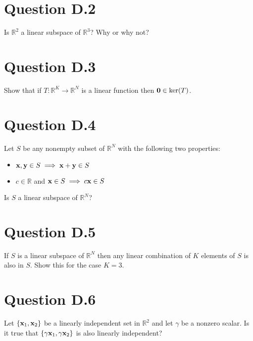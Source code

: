 \documentclass[letterpaper,10pt,english]{jupyterBook}
\begin{document}
\section{Question D.2}
\label{\detokenize{05.exercises.D:question-d-2}}
\sphinxAtStartPar
Is \(\mathbb{R}^2\) a linear subspace of \(\mathbb{R}^3\)? Why or why not?


\section{Question D.3}
\label{\detokenize{05.exercises.D:question-d-3}}
\sphinxAtStartPar
Show that if \(T \colon \mathbb{R}^K \to \mathbb{R}^N\) is a linear function then \({\bf 0} \in \mathrm{ker}(T)\).


\section{Question D.4}
\label{\detokenize{05.exercises.D:question-d-4}}
\sphinxAtStartPar
Let \(S\) be any nonempty subset of \(\mathbb{R}^N\) with the following two
properties:
\begin{itemize}
\item {} 
\sphinxAtStartPar
\({\bf x}, {\bf y} \in S \implies {\bf x} + {\bf y} \in S\)

\item {} 
\sphinxAtStartPar
\(c \in \mathbb{R}\) and \({\bf x} \in S \implies c{\bf x} \in S\)

\end{itemize}

\sphinxAtStartPar
Is \(S\) a linear subspace of \(\mathbb{R}^N\)?


\section{Question D.5}
\label{\detokenize{05.exercises.D:question-d-5}}
\sphinxAtStartPar
If \(S\) is a linear subspace of \(\mathbb{R}^N\) then any linear combination of \(K\)
elements of \(S\) is also in \(S\). Show this for the case \(K = 3\).


\section{Question D.6}
\label{\detokenize{05.exercises.D:question-d-6}}
\sphinxAtStartPar
Let \(\{{\bf x}_1, {\bf x}_2\}\) be a linearly independent set in \(\mathbb{R}^2\) and let
\(\gamma\) be a nonzero scalar. Is it true that \(\{\gamma {\bf x}_1, \gamma
{\bf x}_2\}\) is also linearly independent?
\end{document}
